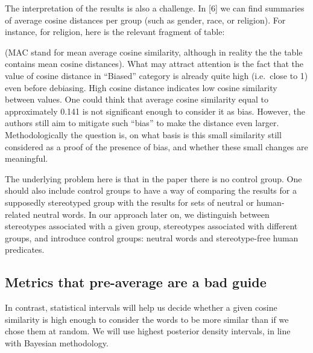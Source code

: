 \documentclass[
  10pt,
  dvipsnames,enabledeprecatedfontcommands, twocolumn]{scrartcl}
\begin{document}
The interpretation of the results is also a challenge. In {[}6{]} we can
find summaries of average cosine distances per group (such as gender,
race, or religion). For instance, for religion, here is the relevant
fragment of table:


\noindent (MAC stand for mean average cosine similarity, although in
reality the the table contains mean cosine distances). What may attract
attention is the fact that the value of cosine distance in ``Biased''
category is already quite high (i.e.~close to 1) even before debiasing.
High cosine distance indicates low cosine similarity between values. One
could think that average cosine similarity equal to approximately 0.141
is not significant enough to consider it as bias. However, the authors
still aim to mitigate such ``bias'' to make the distance even larger.
Methodologically the question is, on what basis is this small similarity
still considered as a proof of the presence of bias, and whether these
small changes are meaningful.

The underlying problem here is that in the paper there is no control
group. One should also include control groups to have a way of comparing
the results for a supposedly stereotyped group with the results for sets
of neutral or human-related neutral words. In our approach later on, we
distinguish between stereotypes associated with a given group,
stereotypes associated with different groups, and introduce control
groups: neutral words and stereotype-free human predicates.




\hypertarget{metrics-that-pre-average-are-a-bad-guide}{%
\subsection{Metrics that pre-average are a bad
guide}\label{metrics-that-pre-average-are-a-bad-guide}}

In contrast, statistical intervals will help us decide whether a given
cosine similarity is high enough to consider the words to be more
similar than if we chose them at random. We will use highest posterior
density intervals, in line with Bayesian methodology.
\end{document}
